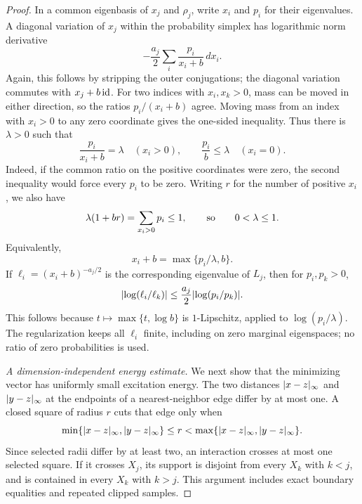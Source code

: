 \begin{proof}
In a common eigenbasis of \(x_j\) and \(\rho_j\), write \(x_i\)
and \(p_i\) for their eigenvalues.  A diagonal variation of \(x_j\)
within the probability simplex has logarithmic norm derivative
\begin{equation}
 -\frac{a_j}{2}\sum_i \frac{p_i}{x_i+b}\,dx_i.
 \label{eq:patch-simplex-derivative}
\end{equation}
Again, this follows by stripping the outer conjugations; the
diagonal variation commutes with \(x_j+b\operatorname{id}\).
For two indices with \(x_i,x_k>0\), mass can be moved in either
direction, so the ratios \(p_i/(x_i+b)\) agree.  Moving mass from
an index with \(x_i>0\) to any zero coordinate gives the one-sided
inequality.  Thus there is \(\lambda>0\) such that
\begin{equation}
 \frac{p_i}{x_i+b}=\lambda\quad(x_i>0),
 \qquad
 \frac{p_i}{b}\leq\lambda\quad(x_i=0).
 \label{eq:patch-kkt}
\end{equation}
Indeed, if the common ratio on the positive coordinates were zero,
the second inequality would force every \(p_i\) to be zero.
Writing \(r\) for the number of positive \(x_i\), we also have
\[
 \lambda(1+br)=\sum_{x_i>0}p_i\leq1,
 \qquad\hbox{so}\qquad 0<\lambda\leq1.
\]
Equivalently,
\begin{equation}
 x_i+b=\max\{p_i/\lambda,b\}.
 \label{eq:patch-clipped-eigenvalues}
\end{equation}
If \(\ell_i=(x_i+b)^{-a_j/2}\) is the corresponding eigenvalue
of \(L_j\), then for \(p_i,p_k>0\),
\begin{equation}
 \lvert \log(\ell_i/\ell_k)\rvert
 \leq \frac{a_j}{2}\lvert \log(p_i/p_k)\rvert .
 \label{eq:patch-log-ratio}
\end{equation}
This follows because \(t\mapsto\max\{t,\log b\}\) is
\(1\)-Lipschitz, applied to \(\log(p_i/\lambda)\).
The regularization keeps all \(\ell_i\) finite, including on zero
marginal eigenspaces; no ratio of zero probabilities is used.

\emph{A dimension-independent energy estimate.}
We next show that the minimizing vector has uniformly small
excitation energy.  The two distances
\(\lvert x-z\rvert_\infty\) and \(\lvert y-z\rvert_\infty\) at the endpoints
of a nearest-neighbor edge differ by at most one.  A closed square
of radius \(r\) cuts that edge only when
\[
 \min\{\lvert x-z\rvert_\infty,\lvert y-z\rvert_\infty\}
       \leq r
       <\max\{\lvert x-z\rvert_\infty,\lvert y-z\rvert_\infty\}.
\]
Since selected radii differ by at least two, an interaction crosses
at most one selected square.  If it crosses \(X_j\), its support
is disjoint from every \(X_k\) with \(k<j\), and is contained in
every \(X_k\) with \(k>j\).  This argument includes exact boundary
equalities and repeated clipped samples.


\end{proof}

